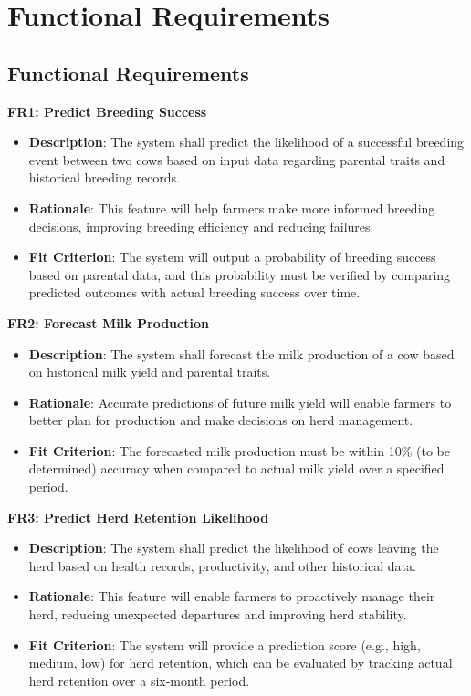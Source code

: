 \documentclass[12pt]{article}
\begin{document}
\section{Functional Requirements}

\subsection{Functional Requirements}

\textbf{FR1: Predict Breeding Success}
\begin{itemize}
    \item \textbf{Description}: The system shall predict the likelihood of a 
    successful breeding event between two cows based on input data regarding 
    parental traits and historical breeding records.
    \item \textbf{Rationale}: This feature will help farmers make more informed 
    breeding decisions, improving breeding efficiency and reducing failures.
    \item \textbf{Fit Criterion}: The system will output a probability of 
    breeding success based on parental data, and this probability must be 
    verified by comparing predicted outcomes with actual breeding success over time.
\end{itemize}
\textbf{FR2: Forecast Milk Production}
\begin{itemize}
    \item \textbf{Description}: The system shall forecast the milk production 
    of a cow based on historical milk yield and parental traits.
    \item \textbf{Rationale}: Accurate predictions of future milk yield will 
    enable farmers to better plan for production and make decisions on herd management.
    \item \textbf{Fit Criterion}: The forecasted milk production must be within 
    10\% (to be determined) accuracy when compared to actual milk yield over a specified period.
\end{itemize}
\textbf{FR3: Predict Herd Retention Likelihood}
\begin{itemize}
    \item \textbf{Description}: The system shall predict the likelihood of 
    cows leaving the herd based on health records, productivity, and other 
    historical data.
    \item \textbf{Rationale}: This feature will enable farmers to proactively 
    manage their herd, reducing unexpected departures and improving herd stability.
    \item \textbf{Fit Criterion}: The system will provide a prediction score 
    (e.g., high, medium, low) for herd retention, which can be evaluated by 
    tracking actual herd retention over a six-month period.
\end{itemize}
\end{document}

